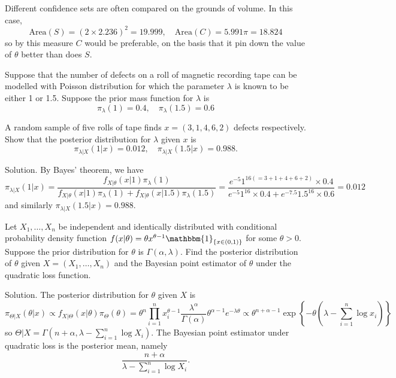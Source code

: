 Different confidence sets are often compared on the grounds of volume. In this case,
\begin{equation}
\text{Area}(S)=(2\times2.236)^2=19.999,\quad \text{Area}(C)= 5.991\pi=18.824
\end{equation}
so by this measure $C$ would be preferable, on the basis that it pin down the value of $\theta$ better than does $S$.





\item Suppose that the number of defects on a roll of magnetic recording tape can be modelled with Poisson distribution for which the parameter $\lambda$ is known to be either 1 or 1.5. Suppose the prior mass function for $\lambda$ is
\begin{equation}
\pi_\lambda(1)=0.4,\quad \pi_\lambda(1.5) =0.6
\end{equation}

A random sample of five rolls of tape finds $x=(3,1,4,6,2)$ defects respectively. Show that the posterior distribution for $\lambda$ given $x$ is
\begin{equation}
\pi_{\lambda|X}(1|x)=0.012,\quad \pi_{\lambda|X}(1.5|x) =0.988.
\end{equation}



Solution. By Bayes' theorem, we have
\begin{equation}
\pi_{\lambda|X}(1|x)=\frac{f_{X|\theta}(x|1)\pi_\lambda(1)}{f_{X|\theta}(x|1)\pi_\lambda(1)+ f_{X|\theta}(x|1.5)\pi_\lambda(1.5)} = \frac{e^{-5}1^{16(=3+1+4+6+2)}\times 0.4}{e^{-5}1^{16}\times 0.4 + e^{-7.5}1.5^{16}\times 0.6}=0.012
\end{equation}
and similarly $\pi_{\lambda|X}(1.5|x)=0.988$.





\item Let $X_1,\dots,X_n$ be independent and identically distributed with conditional probability density function $f(x|\theta)=\theta x^{\theta-1}\mathbbm{1}_{\{x\in(0,1)\}}$ for some $\theta>0$. Suppose the prior distribution for $\theta$ is $\Gamma(\alpha,\lambda)$. Find the posterior distribution of $\theta$ given $X=(X_1,\dots,X_n)$ and the Bayesian point estimator of $\theta$ under the quadratic loss function.



Solution. The posterior distribution for $\theta$ given $X$ is
\begin{equation}
\pi_{\Theta|X}(\theta|x) \propto f_{X|\Theta}(x|\theta)\pi_\Theta(\theta) = \theta^n\prod^n_{i=1} x_i^{\theta-1} \frac{\lambda^\alpha}{\Gamma(\alpha)}\theta^{\alpha-1}e^{-\lambda \theta} \propto \theta^{n+\alpha-1}\exp\left\{-\theta(\lambda-\sum^n_{i=1}\log x_i)\right\}
\end{equation}
so $\Theta|X=\Gamma\left(n+\alpha,\lambda-\sum^n_{i=1}\log X_i\right)$. The Bayesian point estimator under quadratic loss is the posterior mean, namely
\begin{equation}
\frac{n+\alpha}{\lambda-\sum^n_{i=1}\log X_i}.
\end{equation}





